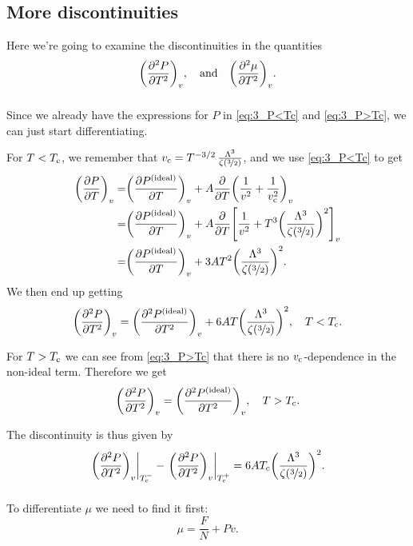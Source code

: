 \documentclass[11pt,letter, swedish, english
]{article}
\begin{document}
\subsection{More discontinuities}
Here we're going to examine the discontinuities in the quantities
\begin{equation}
\qty(\pdv[2]{P}{T})_v \qcomma\text{and}\quad
\qty(\pdv[2]{\mu}{T})_v.
\end{equation}

\subsubsection{}
Since we already have the expressions for $P$ in \eqref{eq:3_P<Tc} and
\eqref{eq:3_P>Tc}, we can just start differentiating.

For $T<T_{\text{c}}$, we remember that
$v_{\text{c}}=T^{-3/2}\,\frac{\Lambda^3}{\zeta(\nicefrac{3}{2})}$, and we use
\eqref{eq:3_P<Tc} to get
\begin{equation}
\begin{aligned}
\qty(\pdv{P}{T})_v=&\qty(\pdv{P^\text{{(ideal)}}}{T})_v
+A\pdv{T}\qty(\frac{1}{v^2}+\frac{1}{v_{\text{c}}^2})_v\\
=&\qty(\pdv{P^\text{{(ideal)}}}{T})_v
+A\pdv{T}\qty[\frac{1}{v^2}+T^3\qty(\frac{\Lambda^3}{\zeta(\nicefrac{3}{2})})^2]_v\\
=&\qty(\pdv{P^\text{{(ideal)}}}{T})_v
+3AT^2\qty(\frac{\Lambda^3}{\zeta(\nicefrac{3}{2})})^2.
\end{aligned}
\end{equation}
We then end up getting
\begin{equation}
\qty(\pdv[2]{P}{T})_v=\qty(\pdv[2]{\ideal{P}}{T})_v
+6AT\qty(\frac{\Lambda^3}{\zeta(\nicefrac{3}{2})})^2
\qcomma T<\Tc.
\end{equation}

For $T>T_{\text{c}}$ we can see from \eqref{eq:3_P>Tc} that there is no
$v_{\text{c}}$-dependence in the non-ideal term. Therefore we get
\begin{equation}
\qty(\pdv[2]{P}{T})_v=\qty(\pdv[2]{\ideal{P}}{T})_v
\qcomma T>\Tc.
\end{equation}

The discontinuity is thus given by
\begin{equation}\label{eq:3_discont._P}
\eval{\qty(\pdv[2]{P}{T})_v}_{\Tc^-}
-\eval{\qty(\pdv[2]{P}{T})_v}_{\Tc^+}
=6A\Tc\qty(\frac{\Lambda^3}{\zeta(\nicefrac{3}{2})})^2.
\end{equation}

\subsubsection{}
To differentiate $\mu$ we need to find it first:
\begin{equation}
\mu=\frac{F}{N}+Pv.
\end{equation}
\end{document}
